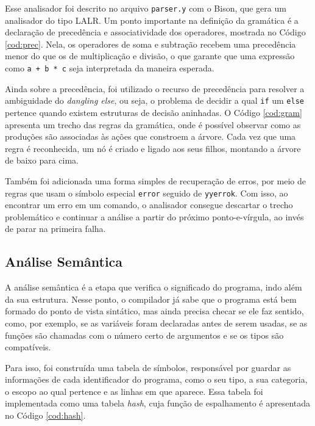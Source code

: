\documentclass[
	12pt,				%
	oneside,
	a4paper,			%
	english,			%
	french,				%
	spanish,			%
	brazil,				%
	]{abntex2}
\begin{document}
Esse analisador foi descrito no arquivo \texttt{parser.y} com o Bison, que gera um analisador do tipo LALR. Um ponto importante na definição da gramática é a declaração de precedência e associatividade dos operadores, mostrada no Código \ref{cod:prec}. Nela, os operadores de soma e subtração recebem uma precedência menor do que os de multiplicação e divisão, o que garante que uma expressão como \texttt{a + b * c} seja interpretada da maneira esperada.



Ainda sobre a precedência, foi utilizado o recurso de precedência para resolver a ambiguidade do \textit{dangling else}, ou seja, o problema de decidir a qual \texttt{if} um \texttt{else} pertence quando existem estruturas de decisão aninhadas. O Código \ref{cod:gram} apresenta um trecho das regras da gramática, onde é possível observar como as produções são associadas às ações que constroem a árvore. Cada vez que uma regra é reconhecida, um nó é criado e ligado aos seus filhos, montando a árvore de baixo para cima.



Também foi adicionada uma forma simples de recuperação de erros, por meio de regras que usam o símbolo especial \texttt{error} seguido de \texttt{yyerrok}. Com isso, ao encontrar um erro em um comando, o analisador consegue descartar o trecho problemático e continuar a análise a partir do próximo ponto-e-vírgula, ao invés de parar na primeira falha.

\subsection{Análise Semântica}
A análise semântica é a etapa que verifica o significado do programa, indo além da sua estrutura. Nesse ponto, o compilador já sabe que o programa está bem formado do ponto de vista sintático, mas ainda precisa checar se ele faz sentido, como, por exemplo, se as variáveis foram declaradas antes de serem usadas, se as funções são chamadas com o número certo de argumentos e se os tipos são compatíveis.

Para isso, foi construída uma tabela de símbolos, responsável por guardar as informações de cada identificador do programa, como o seu tipo, a sua categoria, o escopo ao qual pertence e as linhas em que aparece. Essa tabela foi implementada como uma tabela \textit{hash}, cuja função de espalhamento é apresentada no Código \ref{cod:hash}.
\end{document}
